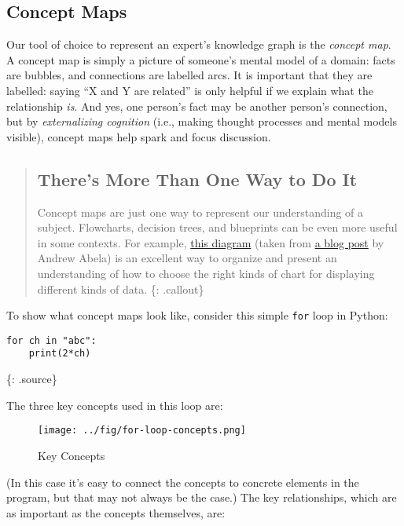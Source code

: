 \subsection{Concept Maps}\label{concept-maps}

Our tool of choice to represent an expert's knowledge graph is the
\emph{concept map}. A concept map is simply a picture of someone's
mental model of a domain: facts are bubbles, and connections are
labelled arcs. It is important that they are labelled: saying ``X and Y
are related'' is only helpful if we explain what the relationship
\emph{is}. And yes, one person's fact may be another person's
connection, but by \emph{externalizing cognition} (i.e., making thought
processes and mental models visible), concept maps help spark and focus
discussion.

\begin{quote}
\subsection{There's More Than One Way to Do
It}\label{theres-more-than-one-way-to-do-it}

Concept maps are just one way to represent our understanding of a
subject. Flowcharts, decision trees, and blueprints can be even more
useful in some contexts. For example,
\href{\{\{\%20page.root\%20\}\}/files/choosing-a-good-chart-09.pdf}{this
diagram} (taken from
\href{http://extremepresentation.typepad.com/blog/2006/09/choosing\_a\_good.html}{a
blog post} by Andrew Abela) is an excellent way to organize and present
an understanding of how to choose the right kinds of chart for
displaying different kinds of data. \{: .callout\}
\end{quote}

To show what concept maps look like, consider this simple \texttt{for}
loop in Python:

\begin{verbatim}
for ch in "abc":
    print(2*ch)
\end{verbatim}

\{: .source\}

The three key concepts used in this loop are:

\begin{figure}[htbp]
\centering
\texttt{[image: ../fig/for-loop-concepts.png]}
\caption{Key Concepts}
\end{figure}

(In this case it's easy to connect the concepts to concrete elements in
the program, but that may not always be the case.) The key
relationships, which are as important as the concepts themselves, are:

